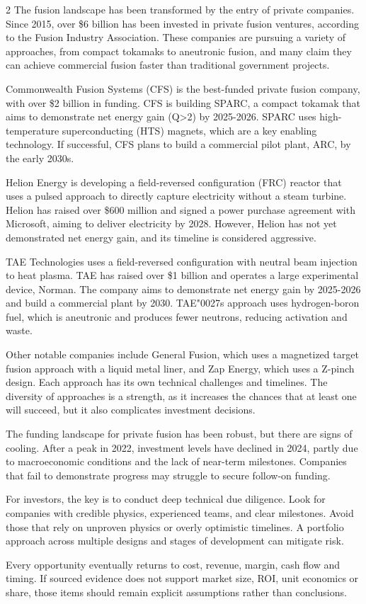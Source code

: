 \documentclass[10pt,a4paper]{article}
\newcommand{\BOApos}{{\BOQuoteFont\char"0027}}
\begin{document}
\begin{multicols}{2}
{\small The fusion landscape has been transformed by the entry of private companies. Since 2015, over \$6 billion has been invested in private fusion ventures, according to the Fusion Industry Association. These companies are pursuing a variety of approaches, from compact tokamaks to aneutronic fusion, and many claim they can achieve commercial fusion faster than traditional government projects.}\par
{\small Commonwealth Fusion Systems (CFS) is the best-funded private fusion company, with over \$2 billion in funding. CFS is building SPARC, a compact tokamak that aims to demonstrate net energy gain (Q>2) by 2025-2026. SPARC uses high-temperature superconducting (HTS) magnets, which are a key enabling technology. If successful, CFS plans to build a commercial pilot plant, ARC, by the early 2030s.}\par
{\small Helion Energy is developing a field-reversed configuration (FRC) reactor that uses a pulsed approach to directly capture electricity without a steam turbine. Helion has raised over \$600 million and signed a power purchase agreement with Microsoft, aiming to deliver electricity by 2028. However, Helion has not yet demonstrated net energy gain, and its timeline is considered aggressive.}\par
{\small TAE Technologies uses a field-reversed configuration with neutral beam injection to heat plasma. TAE has raised over \$1 billion and operates a large experimental device, Norman. The company aims to demonstrate net energy gain by 2025-2026 and build a commercial plant by 2030. TAE\BOApos{}s approach uses hydrogen-boron fuel, which is aneutronic and produces fewer neutrons, reducing activation and waste.}\par
{\small Other notable companies include General Fusion, which uses a magnetized target fusion approach with a liquid metal liner, and Zap Energy, which uses a Z-pinch design. Each approach has its own technical challenges and timelines. The diversity of approaches is a strength, as it increases the chances that at least one will succeed, but it also complicates investment decisions.}\par
{\small The funding landscape for private fusion has been robust, but there are signs of cooling. After a peak in 2022, investment levels have declined in 2024, partly due to macroeconomic conditions and the lack of near-term milestones. Companies that fail to demonstrate progress may struggle to secure follow-on funding.}\par
{\small For investors, the key is to conduct deep technical due diligence. Look for companies with credible physics, experienced teams, and clear milestones. Avoid those that rely on unproven physics or overly optimistic timelines. A portfolio approach across multiple designs and stages of development can mitigate risk.}\par
{\small Every opportunity eventually returns to cost, revenue, margin, cash flow and timing. If sourced evidence does not support market size, ROI, unit economics or share, those items should remain explicit assumptions rather than conclusions.}\par
\end{multicols}
\end{document}
